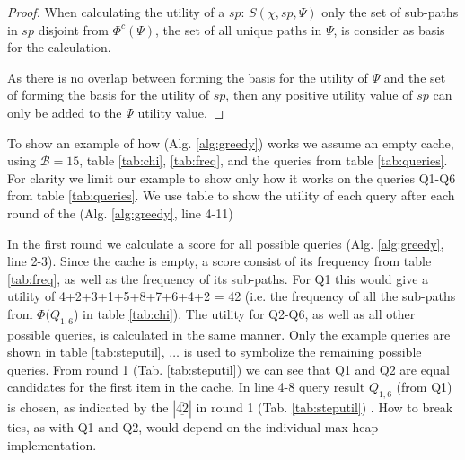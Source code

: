 \begin{proof}

When calculating the utility of a \spath $sp$: $S(\chi, sp, \Psi)$ only the set of sub-paths in $sp$ disjoint from $\Phi^c(\Psi)$, the set of all unique paths in $\Psi$, is consider as basis for the calculation. 

As there is no overlap between \spaths forming the basis for the utility of $\Psi$ and the set of \spaths forming the basis for the utility of $sp$, then any positive utility value of $sp$ can only be added to the $\Psi$ utility value. 

\end{proof}


To show an example of how \salgo (Alg. \ref{alg:greedy}) works we assume an empty cache, using $\mathcal{B}=15$, table \ref{tab:chi}, \ref{tab:freq}, and the queries from table \ref{tab:queries}. For clarity we limit our example to show only how it works on the queries Q1-Q6 from table \ref{tab:queries}. We use table \label{tab:steputil} to show the utility of each query after each round of the \salgo (Alg. \ref{alg:greedy}, line 4-11)

In the first round we calculate a score for all possible queries (Alg. \ref{alg:greedy}, line 2-3). Since the cache is empty, a \spath score consist of its frequency from table \ref{tab:freq}, as well as the frequency of its sub-paths. For Q1 this would give a utility of 4+2+3+1+5+8+7+6+4+2 = 42 (i.e. the frequency of all the sub-paths from $\Phi(Q_{1,6}$) in table \ref{tab:chi}). The utility for Q2-Q6, as well as all other possible queries, is calculated in the same manner. Only the example queries are shown in table \ref{tab:steputil}, $\dots$ is used to symbolize the remaining possible queries. From round 1 (Tab. \ref{tab:steputil}) we can see that Q1 and Q2 are equal candidates for the first item in the cache. In line 4-8 query result $Q_{1,6}$ (from Q1) is chosen, as indicated by the $| \underline{\overline{42}}|$ in round 1 (Tab. \ref{tab:steputil}) . How to break ties, as with Q1 and Q2, would depend on the individual max-heap implementation. 

